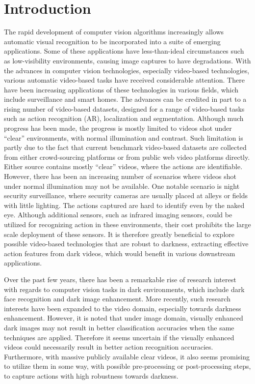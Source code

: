 \documentclass[conference]{IEEEtran}
\begin{document}
\section{Introduction}
The rapid development of computer vision algorithms increasingly allows automatic visual recognition to be incorporated into a suite of emerging applications. Some of these applications have less-than-ideal circumstances such as low-visibility environments, causing image captures to have degradations. With the advances in computer vision technologies, especially video-based technologies, various automatic video-based tasks have received considerable attention. There have been increasing applications of these technologies in various fields, which include surveillance and smart homes. The advances can be credited in part to a rising number of video-based datasets, designed for a range of video-based tasks such as action recognition (AR), localization and segmentation. Although much progress has been made, the progress is mostly limited to videos shot under “clear” environments, with normal illumination and contrast. Such limitation is partly due to the fact that current benchmark video-based datasets are collected from either crowd-sourcing platforms or from public web video platforms directly. Either source contains mostly “clear” videos, where the actions are identifiable. However, there has been an increasing number of scenarios where videos shot under normal illumination may not be available. One notable scenario is night security surveillance, where security cameras are usually placed at alleys or fields with little lighting. The actions captured are hard to identify even by the naked eye. Although additional sensors, such as infrared imaging sensors, could be utilized for recognizing action in these environments, their cost prohibits the large scale deployment of these sensors. It is therefore greatly beneficial to explore possible video-based technologies that are robust to darkness, extracting effective action features from dark videos, which would benefit in various downstream applications.

Over the past few years, there has been a remarkable rise of research interest with regards to computer vision tasks in dark environments, which include dark face recognition and dark image enhancement. More recently, such research interests have been expanded to the video domain, especially towards darkness enhancement. However, it is noted that under image domain, visually enhanced dark images may not result in better classification accuracies when the same techniques are applied. Therefore it seems uncertain if the visually enhanced videos could necessarily result in better action recognition accuracies. Furthermore, with massive publicly available clear videos, it also seems promising to utilize them in some way, with possible pre-processing or post-processing steps, to capture actions with high robustness towards darkness.
\end{document}
